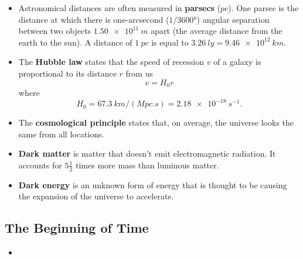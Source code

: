 \documentclass{article}
\begin{document}
\begin{itemize}
  \item Astronomical distances are often measured in \textbf{parsecs} ($\unit{pc}$). One parsec is the distance at which there is one-arcsecond ($1 / \ang{3600}$) angular separation between two objects $\qty{1.50e11}{m}$ apart (the average distance from the earth to the sun). A distance of $\qty{1}{pc}$ is equal to $\qty{3.26}{ly} = \qty{9.46e12}{km}$.

  \item The \textbf{Hubble law} states that the speed of recession $v$ of a galaxy is proportional to its distance $r$ from us \[v = H_0 r\] where \[H_0 = \qty{67.3}{km/(Mpc.s)} = \qty{2.18e-18}{s^{-1}}.\]

  \item The \textbf{cosmological principle} states that, on average, the universe looks the same from all locations.

  \item \textbf{Dark matter} is matter that doesn't emit electromagnetic radiation. It accounts for $5 \frac{1}{2}$ times more mass than luminous matter.

  \item \textbf{Dark energy} is an unknown form of energy that is thought to be causing the expansion of the universe to accelerate.
\end{itemize}

\subsection{The Beginning of Time}

\begin{itemize}
  \item
\end{itemize}
\end{document}
